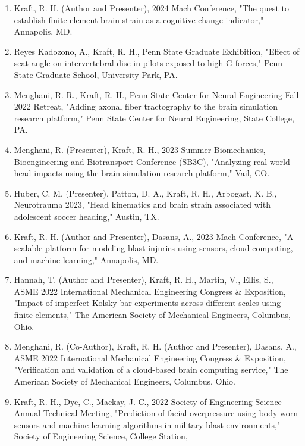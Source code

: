 \documentclass[
]{article}
\begin{document}
\begin{enumerate}
\def\labelenumi{\arabic{enumi}.}
\item
  Kraft, R. H. (Author and Presenter), 2024 Mach Conference, "The quest
  to establish finite element brain strain as a cognitive change
  indicator," Annapolis, MD.
\item
  Reyes Kadozono, A., Kraft, R. H., Penn State Graduate Exhibition,
  "Effect of seat angle on intervertebral disc in pilots exposed to
  high-G forces," Penn State Graduate School, University Park, PA.
\item
  Menghani, R. R., Kraft, R. H., Penn State Center for Neural
  Engineering Fall 2022 Retreat, "Adding axonal fiber tractography to
  the brain simulation research platform\hspace{0pt}," Penn State Center
  for Neural Engineering, State College, PA.
\item
  Menghani, R. (Presenter), Kraft, R. H., 2023 Summer Biomechanics,
  Bioengineering and Biotransport Conference (SB3C), "Analyzing real
  world head impacts using the brain simulation research platform,"
  Vail, CO.
\item
  Huber, C. M. (Presenter), Patton, D. A., Kraft, R. H., Arbogast, K.
  B., Neurotrauma 2023, "Head kinematics and brain strain associated
  with adolescent soccer heading," Austin, TX.
\item
  Kraft, R. H. (Author and Presenter), Dasans, A., 2023 Mach Conference,
  "A scalable platform for modeling blast injuries using sensors, cloud
  computing, and machine learning," Annapolis, MD.
\item
  Hannah, T. (Author and Presenter), Kraft, R. H., Martin, V., Ellis,
  S., ASME 2022 International Mechanical Engineering Congress \&
  Exposition, "Impact of imperfect Kolsky bar experiments across
  different scales using finite elements," The American Society of
  Mechanical Engineers, Columbus, Ohio.
\item
  Menghani, R. (Co-Author), Kraft, R. H. (Author and Presenter), Dasans,
  A., ASME 2022 International Mechanical Engineering Congress \&
  Exposition, "Verification and validation of a cloud-based brain
  computing service," The American Society of Mechanical Engineers,
  Columbus, Ohio.
\item
  Kraft, R. H., Dye, C., Mackay, J. C., 2022 Society of Engineering
  Science Annual Technical Meeting, "Prediction of facial overpressure
  using body worn sensors and machine learning algorithms in military
  blast environments," Society of Engineering Science, College Station,

\end{enumerate}
\end{document}
